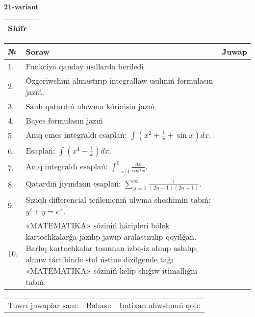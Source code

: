 \documentclass{article}
\begin{document}
  \egroup
  
  \newpage
  
  
  \textbf{21-variant}\\
  
  \bgroup
  \def\arraystretch{1.6} %
  
  \begin{tabular}{|m{5.7cm}|m{9.5cm}|}
  \hline
  Shifr & \\
  \hline
  \end{tabular}
  
  \vspace{1cm}
  
  \begin{tabular}{|m{0.7cm}|m{10cm}|m{4cm}|}
  \hline
  № & Soraw & Juwap \\
  \hline
  1. & Funkciya qanday usıllarda beriledi &  \\
  \hline
  2. & Ózgeriwshini almastırıp integrallaw usılıniń formulasın jazıń. &  \\
  \hline
  3. & Sanlı qatardıń uluwma kórinisin jazıń &  \\
  \hline
  4. & Bayes formulasın jazıń &  \\
  \hline
  5. & Anıq emes integraldı esaplań: \(\int{\left( x^2  + \frac{1}{x} + \sin x \right)dx}\). &  \\
  \hline
  6. & Esaplań: \(\int\left( x^{4} - \frac{1}{x} \right)dx\). &  \\
  \hline
  7. & Anıq integraldı esaplań: \(\int_{- \pi/4}^{0}\frac{dx}{cos^2 x}\). &  \\
  \hline
  8. & Qatardıń jıyındısın esaplań: \(\sum_{n = 1}^{\infty}\frac{1}{(2n - 1)(2n + 1)}\). &  \\
  \hline
  9. & Sızıqlı differencial teńlemeniń ulwma sheshimin tabıń: \(y' + y = e^{x}\). &  \\
  \hline
  10. & «MATEMATIKA» sóziniń háripleri bólek kartochkalarǵa jazılıp jawıp aralastırılıp qoyılǵan. Barlıq kartochkalar tosınnan izbe-iz alınıp ashılıp, alınıw tártibinde stol ústine dizilgende taǵı «MATEMATIKA» sóziniń kelip shıǵıw itimallıǵın tabıń. &  \\
  \hline
  \end{tabular}
  
  \vspace{1cm}
  
  \begin{tabular}{lll}
  Tuwrı juwaplar sanı: \underline{\hspace{1.5cm}} & 
  Bahası: \underline{\hspace{1.5cm}} & 
  Imtixan alıwshınıń qolı: \underline{\hspace{2cm}} \\
  \end{tabular}
  
\end{document}
